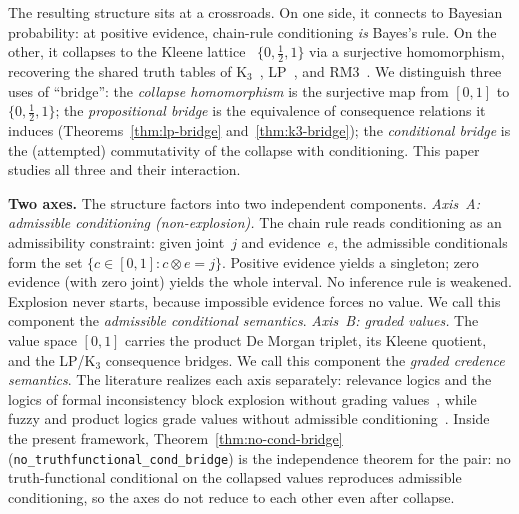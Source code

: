 \documentclass[11pt,a4paper]{article}
\newcommand{\conjc}{\otimes}
\begin{document}
The resulting structure sits at a crossroads.
On one side, it connects to Bayesian probability: at positive
evidence, chain-rule conditioning \emph{is} Bayes's rule.
On the other, it collapses to the Kleene
lattice~\cite{kleene1952} $\{0, \tfrac{1}{2}, 1\}$ via a surjective
homomorphism, recovering the shared truth tables of
K$_3$~\cite{kleene1952},
LP~\cite{asenjo1966,priest1979},
and RM3~\cite{anderson1975,meyer1972}.
We distinguish three uses of ``bridge'':
the \emph{collapse homomorphism} is the surjective map from $[0,1]$
to $\{0, \tfrac{1}{2}, 1\}$;
the \emph{propositional bridge} is the equivalence of consequence
relations it induces (Theorems~\ref{thm:lp-bridge}
and~\ref{thm:k3-bridge});
the \emph{conditional bridge} is the (attempted) commutativity
of the collapse with conditioning.
This paper studies all three and their interaction.

\textbf{Two axes.}
The structure factors into two independent components.
\emph{Axis~A: admissible conditioning (non-explosion).}
The chain rule reads conditioning as an admissibility constraint:
given joint~$j$ and evidence~$e$, the admissible conditionals form
the set $\{c \in [0,1] : c \conjc e = j\}$.
Positive evidence yields a singleton; zero evidence (with zero
joint) yields the whole interval.
No inference rule is weakened.
Explosion never starts, because impossible evidence forces no value.
We call this component the \emph{admissible conditional semantics}.
\emph{Axis~B: graded values.}
The value space $[0,1]$ carries the product De Morgan triplet, its
Kleene quotient, and the LP/K$_3$ consequence bridges.
We call this component the \emph{graded credence semantics}.
The literature realizes each axis separately: relevance logics and
the logics of formal inconsistency block explosion without grading
values~\cite{anderson1975,carnielli2016}, while fuzzy and product
logics grade values without admissible
conditioning~\cite{hajek1998,cintula2011}.
Inside the present framework, Theorem~\ref{thm:no-cond-bridge}
(\texttt{no\_truthfunctional\_cond\_bridge}) is the independence
theorem for the pair: no truth-functional conditional on the
collapsed values reproduces admissible conditioning, so the axes
do not reduce to each other even after collapse.
\end{document}
